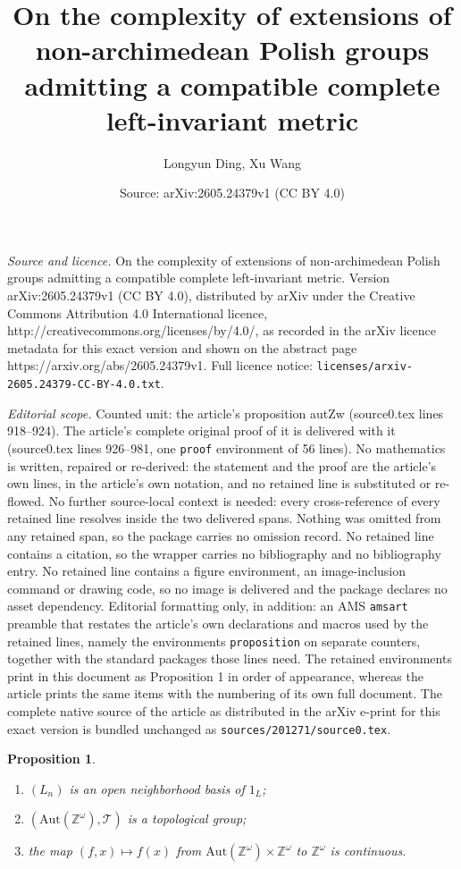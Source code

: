\documentclass[10pt,a4paper]{amsart}
\title{On the complexity of extensions of non-archimedean Polish groups admitting a compatible complete left-invariant metric}
\author{Longyun Ding, Xu Wang}
\date{Source: arXiv:2605.24379v1 (CC BY 4.0)}
\newtheorem{proposition}{Proposition}
\def\Z {{\mathbb{Z}}}
\def\aut{{\mathrm{Aut}}}
\begin{document}
\maketitle

\noindent\emph{Source and licence.} On the complexity of extensions of non-archimedean Polish groups admitting a compatible complete left-invariant metric. Version arXiv:2605.24379v1 (CC BY 4.0), distributed by arXiv under the Creative Commons Attribution 4.0 International licence, http://creativecommons.org/licenses/by/4.0/, as recorded in the arXiv licence metadata for this exact version and shown on the abstract page https://arxiv.org/abs/2605.24379v1. Full licence notice: \texttt{licenses/arxiv-2605.24379-CC-BY-4.0.txt}.\par\smallskip

\noindent\textit{Editorial scope.} Counted unit: the article's proposition autZw (source0.tex lines 918--924). The article's complete original proof of it is delivered with it (source0.tex lines 926--981, one \texttt{proof} environment of 56 lines). No mathematics is written, repaired or re-derived: the statement and the proof are the article's own lines, in the article's own notation, and no retained line is substituted or re-flowed.  No further source-local context is needed: every cross-reference of every retained line resolves inside the two delivered spans.  Nothing was omitted from any retained span, so the package carries no omission record.  No retained line contains a citation, so the wrapper carries no bibliography and no bibliography entry.  No retained line contains a figure environment, an image-inclusion command or drawing code, so no image is delivered and the package declares no asset dependency.  Editorial formatting only, in addition: an AMS \texttt{amsart} preamble that restates the article's own declarations and macros used by the retained lines, namely the environments \texttt{proposition} on separate counters, together with the standard packages those lines need.  The retained environments print in this document as Proposition 1 in order of appearance, whereas the article prints the same items with the numbering of its own full document.  The complete native source of the article as distributed in the arXiv e-print for this exact version is bundled unchanged as \texttt{sources/201271/source0.tex}.
\begin{proposition}\label{property of autZw}
    \begin{enumerate}
        \item $(L_n)$ is an open neighborhood basis of $1_L$;
        \item $(\aut(\Z^\omega),\mathcal{T})$ is a topological group;
        \item the map $(f,x)\mapsto f(x)$ from $\aut(\Z^\omega)\times\Z^\omega$ to $\Z^\omega$ is continuous.
    \end{enumerate}
\end{proposition}
\end{document}
